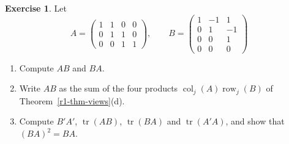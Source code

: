 \documentclass[12pt]{article}
\DeclareMathOperator{\tr}{tr}
\DeclareMathOperator{\row}{row}
\DeclareMathOperator{\col}{col}
\theoremstyle{definition}
\newtheorem{exercise}{Exercise}
\begin{document}
\begin{exercise}\label{r1-ex-products-drill}
Let
\[
A=\begin{pmatrix}1&1&0&0\\0&1&1&0\\0&0&1&1\end{pmatrix},\qquad
B=\begin{pmatrix}1&-1&1\\0&1&-1\\0&0&1\\0&0&0\end{pmatrix}
\]
\begin{enumerate}
\item Compute \(AB\) and \(BA\).
\item Write \(AB\) as the sum of the four products \(\col_j(A)\row_j(B)\) of
Theorem~\ref{r1-thm-views}(d).
\item Compute \(B'A'\), \(\tr(AB)\), \(\tr(BA)\) and \(\tr(A'A)\), and show that
\((BA)^2=BA\).
\end{enumerate}
\end{exercise}
\end{document}
